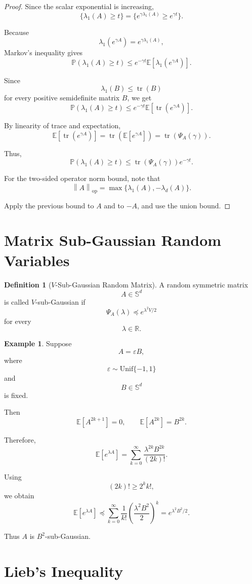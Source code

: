 \documentclass[12pt,oneside]{book}
\numberwithin{equation}{section}
\theoremstyle{definition}
\newtheorem{definition}{Definition}[section]
\newtheorem{example}{Example}[section]
\theoremstyle{plain}
\theoremstyle{remark}
\newcommand{\R}{\mathbb{R}}
\newcommand{\E}{\mathbb{E}}
\newcommand{\Prob}{\mathbb{P}}
\newcommand{\norm}[1]{\left\lVert #1 \right\rVert}
\newcommand{\tr}{\operatorname{tr}}
\begin{document}
\begin{proof}
Since the scalar exponential is increasing,
\[
\{\lambda_1(A)\geq t\}
=
\{e^{\gamma\lambda_1(A)}\geq e^{\gamma t}\}.
\]

Because
\[
\lambda_1(e^{\gamma A})
=
e^{\gamma\lambda_1(A)},
\]
Markov's inequality gives
\[
\Prob(\lambda_1(A)\geq t)
\leq
e^{-\gamma t}
\E[\lambda_1(e^{\gamma A})].
\]

Since
\[
\lambda_1(B)\leq \tr(B)
\]
for every positive semidefinite matrix $B$, we get
\[
\Prob(\lambda_1(A)\geq t)
\leq
e^{-\gamma t}
\E[\tr(e^{\gamma A})].
\]

By linearity of trace and expectation,
\[
\E[\tr(e^{\gamma A})]
=
\tr(\E[e^{\gamma A}])
=
\tr(\Psi_A(\gamma)).
\]

Thus,
\[
\Prob(\lambda_1(A)\geq t)
\leq
\tr(\Psi_A(\gamma))e^{-\gamma t}.
\]

For the two-sided operator norm bound, note that
\[
\norm{A}_{\mathrm{op}}
=
\max\{\lambda_1(A),-\lambda_d(A)\}.
\]

Apply the previous bound to $A$ and to $-A$, and use the union bound.
\end{proof}

\section{Matrix Sub-Gaussian Random Variables}

\begin{definition}[$V$-Sub-Gaussian Random Matrix]
A random symmetric matrix
\[
A\in\mathbb{S}^d
\]
is called $V$-sub-Gaussian if
\[
\Psi_A(\lambda)
\preceq
e^{\lambda^2 V/2}
\]
for every
\[
\lambda\in\R.
\]
\end{definition}

\begin{example}
Suppose
\[
A=\varepsilon B,
\]
where
\[
\varepsilon\sim \mathrm{Unif}\{-1,1\}
\]
and
\[
B\in\mathbb{S}^d
\]
is fixed.

Then
\[
\E[A^{2k+1}]=0,
\qquad
\E[A^{2k}]=B^{2k}.
\]

Therefore,
\[
\E[e^{\lambda A}]
=
\sum_{k=0}^{\infty}
\frac{\lambda^{2k}B^{2k}}{(2k)!}.
\]

Using
\[
(2k)!\geq 2^k k!,
\]
we obtain
\[
\E[e^{\lambda A}]
\preceq
\sum_{k=0}^{\infty}
\frac{1}{k!}
\left(
\frac{\lambda^2B^2}{2}
\right)^k
=
e^{\lambda^2B^2/2}.
\]

Thus $A$ is $B^2$-sub-Gaussian.
\end{example}

\section{Lieb's Inequality}
\end{document}
